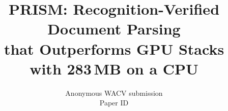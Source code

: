 \documentclass[10pt,twocolumn,letterpaper]{article}
\title{PRISM: Recognition-Verified Document Parsing\\ that Outperforms GPU Stacks with 283\,MB on a CPU}
\author{Anonymous WACV submission\\
Paper ID \paperID}
\begin{document}
\maketitle






{
    \small
    
    
}


\end{document}
